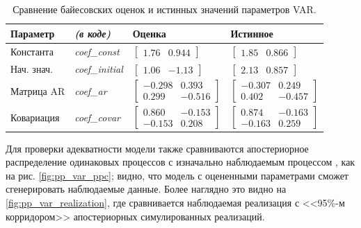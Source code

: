 \documentclass[a4paper,14pt]{extreport}
\begin{document}
\begin{table}[H]
	\begin{tabular}{ll|ll}
		\textbf{Параметр} & \textit{\textbf{(в коде)}} & \textbf{Оценка}              & \textbf{Истинное}            \\ \hline
		Константа         & \textit{coef\_const}       & $\begin{bmatrix} 1.76 & 0.944 \end{bmatrix}$ & $\begin{bmatrix} 1.85 & 0.866 \end{bmatrix}$ \\
		Нач. знач.        & \textit{coef\_initial}     & $\begin{bmatrix} 1.06 & -1.13 \end{bmatrix}$ & $\begin{bmatrix} 2.13 & 0.857 \end{bmatrix}$ \\
		Матрица AR        & \textit{coef\_ar}          & $\begin{bmatrix} -0.298 & 0.393 \\ 0.299 & -0.516 \end{bmatrix}$ & $\begin{bmatrix} -0.307 & 0.249 \\ 0.402 & -0.457 \end{bmatrix}$ \\
		Ковариация        & \textit{coef\_covar}       & $\begin{bmatrix} 0.860 & -0.153 \\ -0.153 & 0.208 \end{bmatrix}$ & $\begin{bmatrix} 0.874 & -0.163 \\ -0.163 & 0.259 \end{bmatrix}$ \\ \hline
	\end{tabular}
	\caption{Сравнение байесовских оценок и истинных значений параметров VAR. }
	\label{tbl:pp_var_param_comparison}
\end{table}


Для проверки адекватности модели также сравниваются апостериорное распределение одинаковых процессов с изначально наблюдаемым процессом \cite{stan_user_guide, arviz_2019}, как на рис. \ref{fig:pp_var_ppc}; видно, что модель с оцененными параметрами сможет сгенерировать наблюдаемые данные. Более наглядно это видно на \ref{fig:pp_var_realization}, где сравнивается наблюдаемая реализация с <<95\%-м корридором>> апостериорных симулированных реализаций. 
\end{document}
